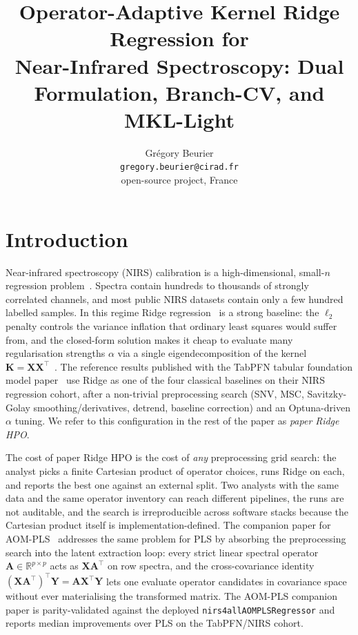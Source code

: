 \documentclass[11pt,a4paper]{article}
\title{Operator-Adaptive Kernel Ridge Regression for\\
Near-Infrared Spectroscopy: Dual Formulation, Branch-CV, and MKL-Light}
\author{Gr\'egory Beurier\\
\texttt{gregory.beurier@cirad.fr}\\
\nirsfourall open-source project, France}
\date{}
\newcommand{\R}{\mathbb{R}}
\newcommand{\Xmat}{\mathbf{X}}
\newcommand{\Ymat}{\mathbf{Y}}
\newcommand{\Amat}{\mathbf{A}}
\newcommand{\Kmat}{\mathbf{K}}
\newcommand{\PLS}{\textsc{PLS}\xspace}
\newcommand{\SNV}{\textsc{SNV}\xspace}
\newcommand{\MSC}{\textsc{MSC}\xspace}
\newcommand{\nirsfourall}{\texttt{nirs4all}\xspace}
\begin{document}
\maketitle



\section{Introduction}\label{sec:intro}

Near-infrared spectroscopy (NIRS) calibration is a high-dimensional,
small-$n$ regression problem~\citep{williams2007implementation,
rinnan2009review}. Spectra contain hundreds to thousands of strongly
correlated channels, and most public NIRS datasets contain only a few
hundred labelled samples. In this regime Ridge
regression~\citep{hoerl1970ridge, hoerl1970application,
hastie2009elements} is a strong baseline: the $\ell_2$ penalty
controls the variance inflation that ordinary least squares would
suffer from, and the closed-form solution makes it cheap to evaluate
many regularisation strengths $\alpha$ via a single eigendecomposition
of the kernel $\Kmat=\Xmat\Xmat^\top$~\citep{saunders1998ridge,
scholkopf2002learning}. The reference results published with the
TabPFN tabular foundation model paper~\citep{hollmann2023tabpfn,
hollmann2025tabpfn} use Ridge as one of the four classical baselines on
their NIRS regression cohort, after a non-trivial preprocessing search
(\SNV, \MSC, Savitzky-Golay smoothing/derivatives, detrend, baseline
correction) and an Optuna-driven $\alpha$ tuning. We refer to this
configuration in the rest of the paper as \emph{paper Ridge HPO}.

The cost of paper Ridge HPO is the cost of \emph{any} preprocessing
grid search: the analyst picks a finite Cartesian product of operator
choices, runs Ridge on each, and reports the best one against an
external split. Two analysts with the same data and the same operator
inventory can reach different pipelines, the runs are not auditable,
and the search is irreproducible across software stacks because the
Cartesian product itself is implementation-defined. The companion
paper for AOM-PLS~\citep{beurier2026aompls} addresses the same problem
for \PLS by absorbing the preprocessing search into the latent
extraction loop: every strict linear spectral operator
$\Amat\in\R^{p\times p}$ acts as $\Xmat\Amat^\top$ on row spectra,
and the cross-covariance identity
$(\Xmat\Amat^\top)^\top\Ymat=\Amat\Xmat^\top\Ymat$ lets one evaluate
operator candidates in covariance space without ever materialising the
transformed matrix. The AOM-PLS companion paper is parity-validated
against the deployed \nirsfourall \texttt{AOMPLSRegressor} and reports
median improvements over \PLS on the TabPFN/NIRS cohort.
\end{document}
